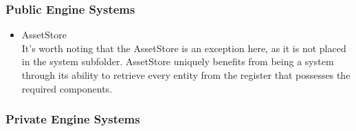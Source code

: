 \subsubsection{Public Engine Systems}
\begin{itemize}
    \item AssetStore\\
    It's worth noting that the AssetStore is an exception here, as it is not placed in the system subfolder. AssetStore uniquely benefits from being a system through its ability to retrieve every entity from the register that possesses the required components.
\end{itemize}

\subsubsection{Private Engine Systems}
